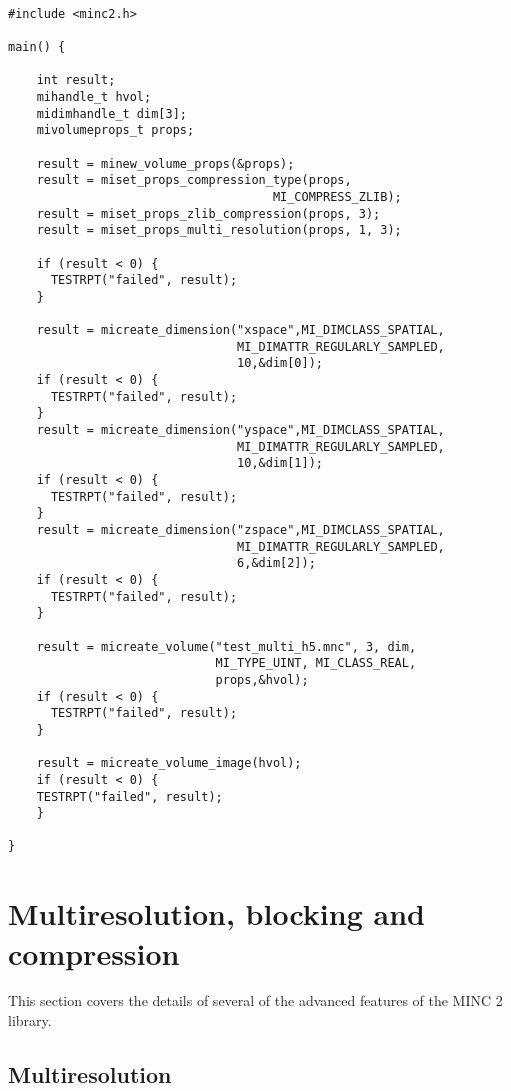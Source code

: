 \documentclass{article}
\begin{document}
\begin{verbatim}

#include <minc2.h>

main() {

    int result;
    mihandle_t hvol;
    midimhandle_t dim[3];
    mivolumeprops_t props;

    result = minew_volume_props(&props);
    result = miset_props_compression_type(props, 
                                     MI_COMPRESS_ZLIB);
    result = miset_props_zlib_compression(props, 3);
    result = miset_props_multi_resolution(props, 1, 3);
    
    if (result < 0) {
      TESTRPT("failed", result);
    }
  
    result = micreate_dimension("xspace",MI_DIMCLASS_SPATIAL,
                                MI_DIMATTR_REGULARLY_SAMPLED, 
                                10,&dim[0]);
    if (result < 0) {
      TESTRPT("failed", result);
    }
    result = micreate_dimension("yspace",MI_DIMCLASS_SPATIAL,
                                MI_DIMATTR_REGULARLY_SAMPLED, 
                                10,&dim[1]);
    if (result < 0) {
      TESTRPT("failed", result);
    }
    result = micreate_dimension("zspace",MI_DIMCLASS_SPATIAL,
                                MI_DIMATTR_REGULARLY_SAMPLED, 
                                6,&dim[2]);
    if (result < 0) {
      TESTRPT("failed", result);
    }

    result = micreate_volume("test_multi_h5.mnc", 3, dim, 
                             MI_TYPE_UINT, MI_CLASS_REAL,
                             props,&hvol);
    if (result < 0) {
      TESTRPT("failed", result);
    }

    result = micreate_volume_image(hvol);
    if (result < 0) {
    TESTRPT("failed", result);
    }
   
}

\end{verbatim}

\section{Multiresolution, blocking and compression}
This section covers the details of several of the advanced features of
the MINC 2 library.

\subsection{Multiresolution}
\end{document}
